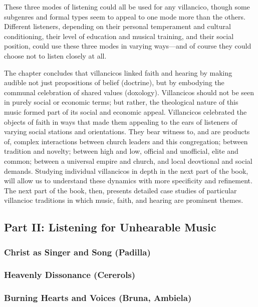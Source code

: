 \documentclass[tt]{vcbook-proposal}
\begin{document}
These three modes of listening could all be used for any villancico, though some subgenres and formal types seem to appeal to one mode more than the others.
Different listeners, depending on their personal temperament and cultural conditioning, their level of education and musical training, and their social position, could use these three modes in varying ways---and of course they could choose not to listen closely at all.

The chapter concludes that villancicos linked faith and hearing by making audible not just propositions of belief (doctrine), but by embodying the communal celebration of shared values (doxology).
Villancicos should not be seen in purely social or economic terms; but rather, the theological nature of this music formed part of its social and economic appeal.
Villancicos celebrated the objects of faith in ways that made them appealing to the ears of listeners of varying social stations and orientations.
They bear witness to, and are products of, complex interactions between church leaders and this congregation; between tradition and novelty; between high and low, official and unofficial, elite and common; between a universal empire and church, and local deovtional and social demands.
Studying individual villancicos in depth in the next part of the book, will allow us to understand these dynamics with more specificity and refinement.
The next part of the book, then, presents detailed case studies of particular villancioc traditions in which music, faith, and hearing are prominent themes.


\subsection{Part II: Listening for Unhearable Music}

\subsubsection{Christ as Singer and Song (Padilla)}

\subsubsection{Heavenly Dissonance (Cererols)}

\subsubsection{Burning Hearts and Voices (Bruna, Ambiela)}
\end{document}
